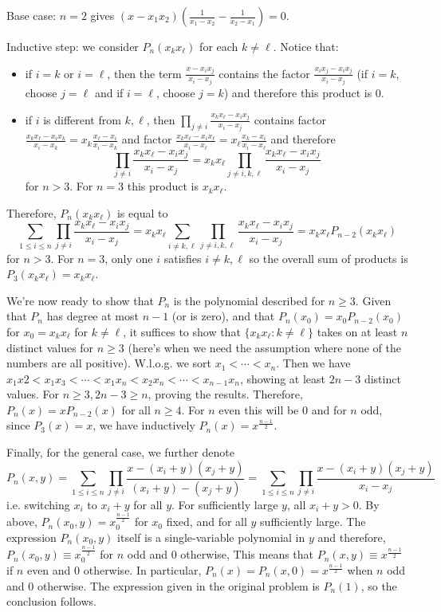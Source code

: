 \documentclass[11pt,a4paper]{article}
\begin{document}
\begin{enumerate}
	Base case: $n=2$ gives $(x-x_1x_2)(\frac{1}{x_1-x_2}-\frac{1}{x_2-x_1})=0$. 
	
	Inductive step: we consider $P_n(x_kx_{\ell})$ for each $k\neq \ell$. Notice that: 
	\begin{itemize}
		\item if $i=k$ or $i=\ell$, then the term $\frac{x-x_{i} x_{j}}{x_{i}-x_{j}}$ contains the factor $\frac{x_ix_{j}-x_ix_j}{x_i-x_j}$ (if $i=k$, choose $j=\ell$ and if $i=\ell$, choose $j=k$) and therefore this product is 0. 
		
		\item if $i$ is different from $k, \ell$, then $\prod_{j \neq i} \frac{x_kx_{\ell}-x_{i} x_{j}}{x_{i}-x_{j}}$ contains factor $\frac{x_kx_{\ell}-x_{i} x_{k}}{x_{i}-x_{k}}=x_{k}\frac{x_\ell-x_i}{x_i-x_k}$ and factor $\frac{x_kx_{\ell}-x_{i} x_{\ell}}{x_{i}-x_{\ell}}=x_{\ell}\frac{x_k-x_i}{x_i-x_\ell}$ and therefore 
		\[
		\prod_{j \neq i} \frac{x_kx_{\ell}-x_{i} x_{j}}{x_{i}-x_{j}}
		=x_kx_{\ell}\prod_{j \neq i, k, \ell} \frac{x_kx_{\ell}-x_{i} x_{j}}{x_{i}-x_{j}}
		\]
		for $n>3$. For $n=3$ this product is $x_kx_{\ell}$. 
	\end{itemize}
	Therefore, $P_n(x_{k}x_{\ell})$ is equal to 
	\[
	\sum_{1 \leqslant i \leqslant n} \prod_{j \neq i} \frac{x_kx_\ell-x_{i} x_{j}}{x_{i}-x_{j}}
	=
	x_kx_{\ell}\sum_{i\neq k, \ell} \prod_{j \neq i, k, \ell} \frac{x_kx_{\ell}-x_{i} x_{j}}{x_{i}-x_{j}}
	=x_kx_{\ell}P_{n-2}(x_kx_{\ell})
	\]
	for $n>3$. For $n=3$, only one $i$ satisfies $i\neq k, \ell$ so the overall sum of products is $P_3(x_kx_{\ell})=x_kx_{\ell}$. 
	
	We're now ready to show that $P_n$ is the polynomial described for $n\ge 3$. Given that $P_n$ has degree at most $n-1$ (or is zero), and that $P_n(x_0)=x_0P_{n-2}(x_0)$ for $x_0=x_kx_{\ell}$ for $k\neq \ell$, it suffices to show that $\{x_kx_{\ell}: k\neq \ell\}$ takes on at least $n$ distinct values for $n\ge 3$ (here's when we need the assumption where none of the numbers are all positive). 
	W.l.o.g. we sort $x_1<\cdots < x_n$. Then we have $x_1x2<x_1x_3<\cdots < x_1x_n < x_2x_n < \cdots < x_{n-1}x_n$, showing at least $2n-3$ distinct values. For $n\ge 3, 2n-3\ge n$, proving the results. Therefore, $P_n(x)=xP_{n-2}(x)$ for all $n\ge 4$. For $n$ even this will be 0 and for $n$ odd, since $P_3(x)=x$, we have inductively $P_n(x)=x^{\frac{n-1}{2}}$. 
	
	Finally, for the general case, we further denote 
	\[
	P_n(x, y)=\sum_{1 \leqslant i \leqslant n} \prod_{j \neq i} \frac{x-(x_{i}+y)(x_{j} + y)}{(x_{i}+y)-(x_{j}+y)}
	=\sum_{1 \leqslant i \leqslant n} \prod_{j \neq i} \frac{x-(x_{i}+y)(x_{j} + y)}{x_i-x_j}
	\]
	i.e. switching $x_i$ to $x_i+y$ for all $y$. For sufficiently large $y$, all $x_i+y>0$. By above, $P_n(x_0, y)=x_0^{\frac{n-1}{2}}$ for $x_0$ fixed, and for all $y$ sufficiently large. The expression $P_n(x_0, y)$ itself is a single-variable polynomial in $y$ and therefore, $P_n(x_0, y)\equiv x_0^{\frac{n-1}{2}}$ for $n$ odd and 0 otherwise, This means that $P_n(x, y)\equiv x^{\frac{n-1}{2}}$ if $n$ even and 0 otherwise. In particular, $P_n(x)=P_n(x, 0)=x^{\frac{n-1}{2}}$ when $n$ odd and 0 otherwise. The expression given in the original problem is $P_n(1)$, so the conclusion follows. 
	

\end{enumerate}
\end{document}
